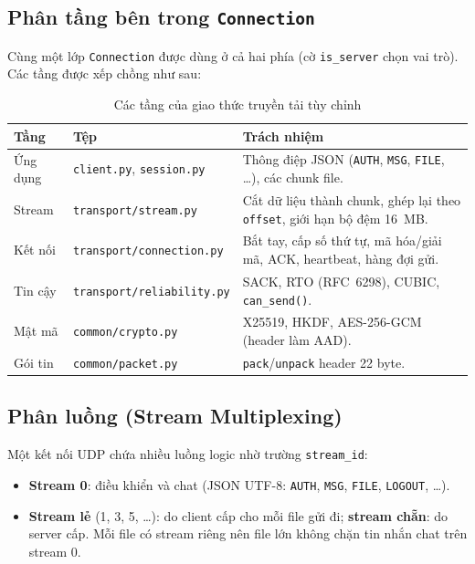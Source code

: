 \subsection{Phân tầng bên trong \texttt{Connection}}
Cùng một lớp \texttt{Connection} được dùng ở cả hai phía (cờ \texttt{is\_server} chọn vai trò). Các tầng được xếp chồng như sau:

\begin{table}[H]
\centering
\renewcommand{\arraystretch}{1.25}
\begin{tabular}{|l|l|p{}|}
\hline
\textbf{Tầng} & \textbf{Tệp} & \textbf{Trách nhiệm} \\ \hline
Ứng dụng & \texttt{client.py}, \texttt{session.py} & Thông điệp JSON (\texttt{AUTH}, \texttt{MSG}, \texttt{FILE}, \ldots), các chunk file. \\ \hline
Stream & \texttt{transport/stream.py} & Cắt dữ liệu thành chunk, ghép lại theo \texttt{offset}, giới hạn bộ đệm 16~MB. \\ \hline
Kết nối & \texttt{transport/connection.py} & Bắt tay, cấp số thứ tự, mã hóa/giải mã, ACK, heartbeat, hàng đợi gửi. \\ \hline
Tin cậy & \texttt{transport/reliability.py} & SACK, RTO (RFC~6298), CUBIC, \texttt{can\_send()}. \\ \hline
Mật mã & \texttt{common/crypto.py} & X25519, HKDF, AES-256-GCM (header làm AAD). \\ \hline
Gói tin & \texttt{common/packet.py} & \texttt{pack}/\texttt{unpack} header 22 byte. \\ \hline
\end{tabular}
\caption{Các tầng của giao thức truyền tải tùy chỉnh}
\end{table}

\subsection{Phân luồng (Stream Multiplexing)}
Một kết nối UDP chứa nhiều luồng logic nhờ trường \texttt{stream\_id}:
\begin{itemize}
    \item \textbf{Stream 0}: điều khiển và chat (JSON UTF-8: \texttt{AUTH}, \texttt{MSG}, \texttt{FILE}, \texttt{LOGOUT}, \ldots).
    \item \textbf{Stream lẻ} (1, 3, 5, \ldots): do client cấp cho mỗi file gửi đi; \textbf{stream chẵn}: do server cấp. Mỗi file có stream riêng nên file lớn không chặn tin nhắn chat trên stream 0.
\end{itemize}

